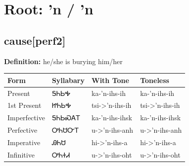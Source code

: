 \documentclass{article}%
\begin{document}
%
\normalsize%
\section*{Root: 'n / 'n}%
\subsection*{cause[perf2]}%
\textbf{Definition: }%
he/she is burying him/her%
\\[0.5em]%
\begin{tabular}{|l|l|l|l|}%
\hline%
\textbf{Form}&\textbf{Syllabary}&\textbf{With Tone}&\textbf{Toneless}\\%
\hline%
Present&ᎦᏂᏏᎭ&ka{-}'n{-}ihs{-}ih&ka{-}'n{-}ihs{-}ih\\%
1st Present&ᏥᏂᏏᎭ&tsi{-}>'n{-}ihs{-}ih&tsi{-}>'n{-}ihs{-}ih\\%
Imperfective&ᎦᏂᏏᏍᎪᎢ&ka{-}'n{-}ihs{-}ihsk&ka{-}'n{-}ihs{-}ihsk\\%
Perfective&ᎤᏂᏌᏅᎢ&u{-}>'n{-}ihs{-}anh&u{-}>'n{-}ihs{-}anh\\%
Imperative&ᎯᏂᏌ&hi{-}>'n{-}ihs{-}a&hi{-}>'n{-}ihs{-}a\\%
Infinitive&ᎤᏂᏐᏗ&u{-}>'n{-}ihs{-}oht&u{-}>'n{-}ihs{-}oht\\%
\hline%
\end{tabular}%
\\[1em]%
\end{document}
